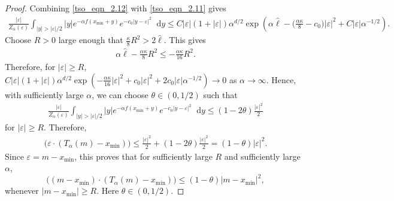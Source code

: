 \documentclass[10pt,a4paper]{amsart}
\newcommand*\der{\mathop{}\!\mathrm{d}}
\begin{document}
\begin{proof}
Combining \eqref{tso_eqn_2.12} with \eqref{tso_eqn_2.11} gives
\begin{align*} 
\frac{|\varepsilon|}{Z_\alpha(\varepsilon)}  \int_{|y| > |\varepsilon| /2} |y| e^{-\alpha f(x_{\min} + y)} e^{-c_0|y - \varepsilon|^2} \der y \leq C|\varepsilon|(1 + |\varepsilon|) \alpha^{d/2} \exp\left(\alpha \hat \ell - \big(\frac{\alpha \kappa}{8} - c_0\big)|\varepsilon|^2 + C|\varepsilon|\alpha^{-1/2}\right).
\end{align*}
Choose $R > 0$ large enough that $\frac{\kappa}{8}R^2 > 2\hat{\ell}$. This gives 
\begin{align*} 
\alpha \hat{\ell} - \frac{\alpha \kappa}{8}R^2 \leq -\frac{\alpha \kappa}{16}R^2. 
\end{align*}
Therefore, for $|\varepsilon| \geq R$, $C |\varepsilon|(1+|\varepsilon|)\alpha^{d/2} \exp\left(-\frac{\alpha \kappa}{16}|\varepsilon|^2 + c_0|\varepsilon|^2 + 2 c_0 |\varepsilon|\alpha^{-1/2}\right) \to 0 $
as $\alpha \to \infty$. Hence, with sufficiently large $\alpha$, we can choose $\theta \in (0, 1/2)$ such that 
\begin{align*} 
\frac{|\varepsilon|}{Z_\alpha(\varepsilon)} \int_{|y| > |\varepsilon| /2} |y| e^{-\alpha f(x_{\min} + y)} e^{-c_0|y - \varepsilon|^2} \der y \leq (1-2\theta)\frac{|\varepsilon|^2}{2}
\end{align*}
for $|\varepsilon| \geq R$. Therefore,
\begin{align*}
\big(\varepsilon \cdot (T_\alpha(m) - x_{\min}) \big)\leq \frac{|\varepsilon|^2}{2} + (1 -2 \theta)\frac{|\varepsilon|^2}{2} = (1 -\theta)|\varepsilon|^2.
\end{align*}
Since $\varepsilon = m - x_{\min}$, this proves that for sufficiently large $R$ and sufficiently large $\alpha$,
\begin{equation} \label{tso_eqn_2.17}
\big( (m - x_{\min} ) \cdot (T_\alpha(m) - x_{\min})\big) \leq (1-\theta)|m - x_{\min}|^2,
\end{equation}
whenever $ |m - x_{\min}| \geq R$. Here $\theta \in (0, 1/2)$. 


\end{proof}
\end{document}
